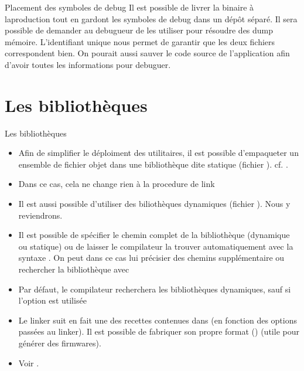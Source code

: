 \begin{frame}[fragile=singleslide]{Placement des symboles de debug}
  Il est possible de livrer  la binaire à laproduction tout en gardont
  les  symboles de debug  dans un  dépôt séparé.  Il sera  possible de
  demander  au  debugueur  de  les  utiliser pour  résoudre  des  dump
  mémoire. L'identifiant  unique nous permet de garantir  que les deux
  fichiers correspondent bien. On  pourait aussi sauver le code source
  de l'application afin d'avoir toutes les informations pour debuguer.
\end{frame}

\section{Les bibliothèques}

\begin{frame}[fragile=singleslide]{Les bibliothèques}
  \begin{itemize}
  \item  Afin de  simplifier  le déploiment  des  utilitaires, il  est
    possible  d'empaqueter  un  ensemble  de fichier  objet  dans  une
    bibliothèque dite statique (fichier ). cf. .
  \item Dans ce cas, cela ne change rien à la procedure de link
  \item Il  est aussi possible d'utiliser  des biliothèques dynamiques
    (fichier ). Nous y reviendrons.
  \item  Il  est  possible  de  spécifier  le  chemin  complet  de  la
    bibliothèque (dynamique ou statique)  ou de laisser le compilateur
    la trouver automatiquement avec la syntaxe .  On peut
    dans ce cas lui précisier des chemins supplémentaire ou rechercher
    la bibliothèque avec 
  \item  Par  défaut,  le  compilateur recherchera  les  bibliothèques
    dynamiques, sauf si l'option  est utilisée
  \item  Le  linker suit  en  fait  une  des recettes  contenues  dans
      (en fonction  des  options passées  au
    linker).   Il   est  possible  de  fabriquer   son  propre  format
    () (utile pour générer des firmwares).
  \item Voir .
  \end{itemize} 
\end{frame}

